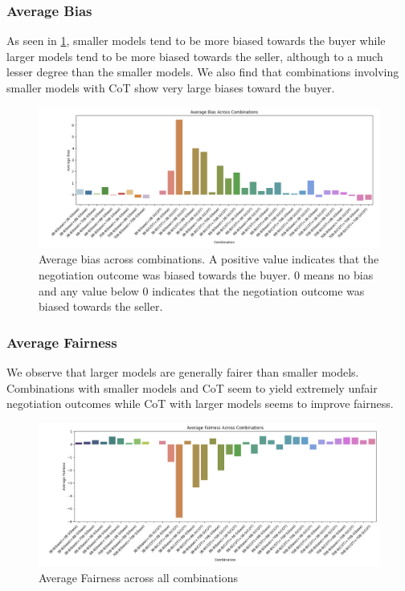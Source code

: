\documentclass[11pt]{article}
\begin{document}
\subsubsection{Average Bias}
As seen in \ref{fig:avg_bias_size_cot}, smaller models tend to be more biased towards the buyer while larger models tend to be more biased towards the seller, although to a much lesser degree than the smaller models. We also find that combinations involving smaller models with CoT show very large biases toward the buyer.
\begin{figure}[h]
    \centering
    \includegraphics[width=1\linewidth]{figures/scale_cot/avg_bias_size_cot.png}
    \caption{Average bias across combinations. A positive value indicates that the negotiation outcome was biased towards the buyer. 0 means no bias and any value below 0 indicates that the negotiation outcome was biased towards the seller.}
    \label{fig:avg_bias_size_cot}
\end{figure}

\subsubsection{Average Fairness}
We observe that larger models are generally fairer than smaller models. Combinations with smaller models and CoT seem to yield extremely unfair negotiation outcomes while CoT with larger models seems to improve fairness.
\begin{figure}[h]
    \centering
    \includegraphics[width=1\linewidth]{figures/scale_cot/avg_fairness.png}
    \caption{Average Fairness across all combinations}
    \label{fig:avg_fairness_size_cot}
\end{figure}
\end{document}
